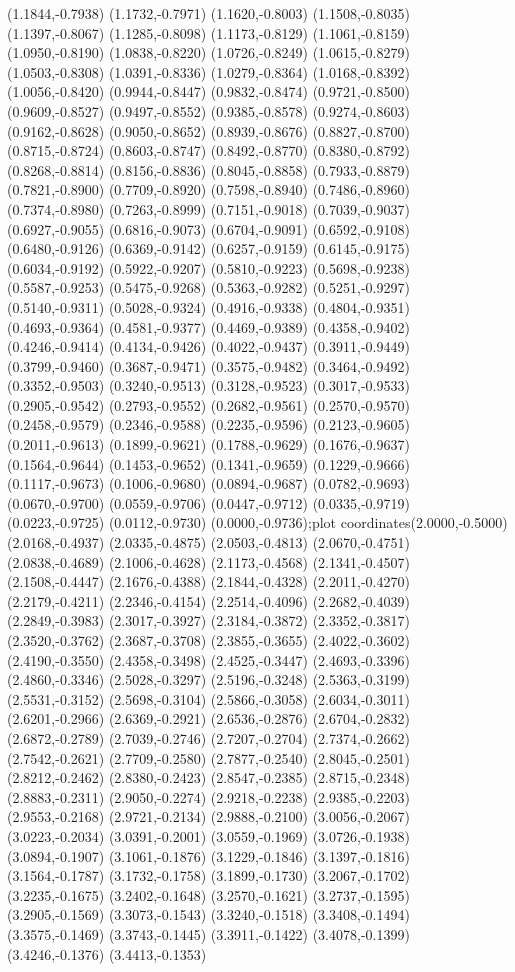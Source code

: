 {(1.1844,-0.7938) (1.1732,-0.7971) (1.1620,-0.8003) (1.1508,-0.8035) (1.1397,-0.8067) (1.1285,-0.8098) (1.1173,-0.8129) (1.1061,-0.8159) (1.0950,-0.8190) (1.0838,-0.8220) (1.0726,-0.8249) (1.0615,-0.8279) (1.0503,-0.8308) (1.0391,-0.8336) (1.0279,-0.8364) (1.0168,-0.8392) (1.0056,-0.8420) (0.9944,-0.8447) (0.9832,-0.8474) (0.9721,-0.8500) (0.9609,-0.8527) (0.9497,-0.8552) (0.9385,-0.8578) (0.9274,-0.8603) (0.9162,-0.8628) (0.9050,-0.8652) (0.8939,-0.8676) (0.8827,-0.8700) (0.8715,-0.8724) (0.8603,-0.8747) (0.8492,-0.8770) (0.8380,-0.8792) (0.8268,-0.8814) (0.8156,-0.8836) (0.8045,-0.8858) (0.7933,-0.8879) (0.7821,-0.8900) (0.7709,-0.8920) (0.7598,-0.8940) (0.7486,-0.8960) (0.7374,-0.8980) (0.7263,-0.8999) (0.7151,-0.9018) (0.7039,-0.9037) (0.6927,-0.9055) (0.6816,-0.9073) (0.6704,-0.9091) (0.6592,-0.9108) (0.6480,-0.9126) (0.6369,-0.9142) (0.6257,-0.9159) (0.6145,-0.9175) (0.6034,-0.9192) (0.5922,-0.9207) (0.5810,-0.9223) (0.5698,-0.9238) (0.5587,-0.9253) (0.5475,-0.9268) (0.5363,-0.9282) (0.5251,-0.9297) (0.5140,-0.9311) (0.5028,-0.9324) (0.4916,-0.9338) (0.4804,-0.9351) (0.4693,-0.9364) (0.4581,-0.9377) (0.4469,-0.9389) (0.4358,-0.9402) (0.4246,-0.9414) (0.4134,-0.9426) (0.4022,-0.9437) (0.3911,-0.9449) (0.3799,-0.9460) (0.3687,-0.9471) (0.3575,-0.9482) (0.3464,-0.9492) (0.3352,-0.9503) (0.3240,-0.9513) (0.3128,-0.9523) (0.3017,-0.9533) (0.2905,-0.9542) (0.2793,-0.9552) (0.2682,-0.9561) (0.2570,-0.9570) (0.2458,-0.9579) (0.2346,-0.9588) (0.2235,-0.9596) (0.2123,-0.9605) (0.2011,-0.9613) (0.1899,-0.9621) (0.1788,-0.9629) (0.1676,-0.9637) (0.1564,-0.9644) (0.1453,-0.9652) (0.1341,-0.9659) (0.1229,-0.9666) (0.1117,-0.9673) (0.1006,-0.9680) (0.0894,-0.9687) (0.0782,-0.9693) (0.0670,-0.9700) (0.0559,-0.9706) (0.0447,-0.9712) (0.0335,-0.9719) (0.0223,-0.9725) (0.0112,-0.9730) (0.0000,-0.9736)};plot coordinates{(2.0000,-0.5000) (2.0168,-0.4937) (2.0335,-0.4875) (2.0503,-0.4813) (2.0670,-0.4751) (2.0838,-0.4689) (2.1006,-0.4628) (2.1173,-0.4568) (2.1341,-0.4507) (2.1508,-0.4447) (2.1676,-0.4388) (2.1844,-0.4328) (2.2011,-0.4270) (2.2179,-0.4211) (2.2346,-0.4154) (2.2514,-0.4096) (2.2682,-0.4039) (2.2849,-0.3983) (2.3017,-0.3927) (2.3184,-0.3872) (2.3352,-0.3817) (2.3520,-0.3762) (2.3687,-0.3708) (2.3855,-0.3655) (2.4022,-0.3602) (2.4190,-0.3550) (2.4358,-0.3498) (2.4525,-0.3447) (2.4693,-0.3396) (2.4860,-0.3346) (2.5028,-0.3297) (2.5196,-0.3248) (2.5363,-0.3199) (2.5531,-0.3152) (2.5698,-0.3104) (2.5866,-0.3058) (2.6034,-0.3011) (2.6201,-0.2966) (2.6369,-0.2921) (2.6536,-0.2876) (2.6704,-0.2832) (2.6872,-0.2789) (2.7039,-0.2746) (2.7207,-0.2704) (2.7374,-0.2662) (2.7542,-0.2621) (2.7709,-0.2580) (2.7877,-0.2540) (2.8045,-0.2501) (2.8212,-0.2462) (2.8380,-0.2423) (2.8547,-0.2385) (2.8715,-0.2348) (2.8883,-0.2311) (2.9050,-0.2274) (2.9218,-0.2238) (2.9385,-0.2203) (2.9553,-0.2168) (2.9721,-0.2134) (2.9888,-0.2100) (3.0056,-0.2067) (3.0223,-0.2034) (3.0391,-0.2001) (3.0559,-0.1969) (3.0726,-0.1938) (3.0894,-0.1907) (3.1061,-0.1876) (3.1229,-0.1846) (3.1397,-0.1816) (3.1564,-0.1787) (3.1732,-0.1758) (3.1899,-0.1730) (3.2067,-0.1702) (3.2235,-0.1675) (3.2402,-0.1648) (3.2570,-0.1621) (3.2737,-0.1595) (3.2905,-0.1569) (3.3073,-0.1543) (3.3240,-0.1518) (3.3408,-0.1494) (3.3575,-0.1469) (3.3743,-0.1445) (3.3911,-0.1422) (3.4078,-0.1399) (3.4246,-0.1376) (3.4413,-0.1353) }
